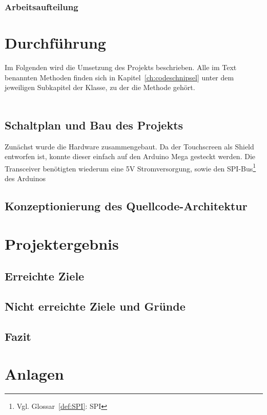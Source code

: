 \documentclass[a4paper, 11pt]{scrartcl}
\begin{document}
\subsubsection{Arbeitsaufteilung}

\section{Durchführung}
Im Folgenden wird die Umsetzung des Projekts beschrieben. Alle im Text benannten Methoden finden sich in Kapitel~\ref{ch:codeschnipsel} unter dem jeweiligen Subkapitel
der Klasse, zu der die Methode gehört.
\\
\\
\subsection{Schaltplan und Bau des Projekts}
Zunächst wurde die Hardware zusammengebaut. Da der Touchscreen als Shield entworfen ist, konnte dieser einfach auf den Arduino Mega gesteckt werden. 
Die Transceiver benötigten wiederum eine 5V Stromversorgung, sowie den SPI-Bus\footnote{Vgl. Glossar~\ref{def:SPI}: SPI} des Arduinos

\subsection{Konzeptionierung des Quellcode-Architektur}




\section{Projektergebnis}
\subsection{Erreichte Ziele}


\subsection{Nicht erreichte Ziele und Gründe}


\subsection{Fazit}
\newpage
\section{Anlagen}
\end{document}
